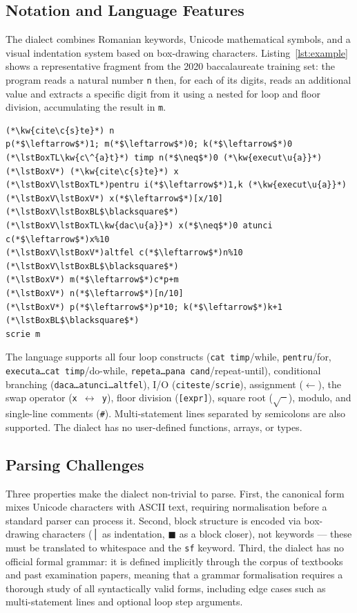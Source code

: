 \documentclass[conference]{IEEEtran}
\def\lstBoxV{\textSFxi}   %
\def\lstBoxTL{\textSFi}   %
\def\lstBoxBL{\textSFii}  %
\def\kw#1{{\bfseries #1}}
\begin{document}
\subsection{Notation and Language Features}

The dialect combines Romanian keywords, Unicode mathematical symbols, and a
visual indentation system based on box-drawing characters.  Listing~\ref{lst:example}
shows a representative fragment from the 2020 baccalaureate training set: the
program reads a natural number \texttt{n} then, for each of its digits,
reads an additional value and extracts a specific digit from it using a
nested for loop and floor division, accumulating the result in \texttt{m}.

\begin{lstlisting}[language=pseudo, caption={A 2020 baccalaureate training problem in canonical Unicode notation.}, label=lst:example]
(*\kw{cite\c{s}te}*) n
p(*$\leftarrow$*)1; m(*$\leftarrow$*)0; k(*$\leftarrow$*)0
(*\lstBoxTL\kw{c\^{a}t}*) timp n(*$\neq$*)0 (*\kw{execut\u{a}}*)
(*\lstBoxV*) (*\kw{cite\c{s}te}*) x
(*\lstBoxV\lstBoxTL*)pentru i(*$\leftarrow$*)1,k (*\kw{execut\u{a}}*)
(*\lstBoxV\lstBoxV*) x(*$\leftarrow$*)[x/10]
(*\lstBoxV\lstBoxBL$\blacksquare$*)
(*\lstBoxV\lstBoxTL\kw{dac\u{a}}*) x(*$\neq$*)0 atunci c(*$\leftarrow$*)x%10
(*\lstBoxV\lstBoxV*)altfel c(*$\leftarrow$*)n%10
(*\lstBoxV\lstBoxBL$\blacksquare$*)
(*\lstBoxV*) m(*$\leftarrow$*)c*p+m
(*\lstBoxV*) n(*$\leftarrow$*)[n/10]
(*\lstBoxV*) p(*$\leftarrow$*)p*10; k(*$\leftarrow$*)k+1
(*\lstBoxBL$\blacksquare$*)
scrie m
\end{lstlisting}

The language supports all four loop constructs (\texttt{cat timp}/while,
\texttt{pentru}/for, \texttt{executa\ldots cat timp}/do-while,
\texttt{repeta\ldots pana cand}/repeat-until), conditional branching
(\texttt{daca\ldots atunci\ldots altfel}), I/O (\texttt{citeste}/\texttt{scrie}),
assignment ($\leftarrow$), the swap operator
(\texttt{x $\leftrightarrow$ y}), floor division (\texttt{[expr]}),
square root ($\sqrt{\phantom{x}}$), modulo, and single-line comments
(\texttt{\#}).  Multi-statement lines separated by semicolons are also
supported.  The dialect has no user-defined functions, arrays, or types.

\subsection{Parsing Challenges}

Three properties make the dialect non-trivial to parse.  First, the canonical
form mixes Unicode characters with ASCII text, requiring normalisation before
a standard parser can process it.  Second, block structure is encoded via
box-drawing characters (│ as indentation, $\blacksquare$ as a block
closer), not keywords --- these must be translated to whitespace and the
\texttt{sf} keyword.  Third, the dialect has no official formal grammar: it is
defined implicitly through the corpus of textbooks and past examination papers,
meaning that a grammar formalisation requires a thorough study of all
syntactically valid forms, including edge cases such as multi-statement lines
and optional loop step arguments.
\end{document}
